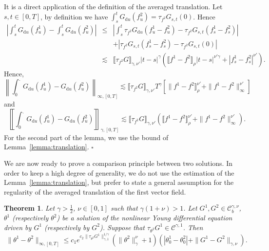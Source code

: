 \documentclass[a4paper,11pt]{article}
\newcommand{\mathd}{\mathrm{d}}
\newtheorem{theorem}{Theorem}[section]
\newenvironment{proof}{{\sc Proof.}}{\hfill$\square$}
\newcommand{\CC}{\mathscr C}
\begin{document}
\begin{proof}
  It is a direct application of the definition of the averaged translation.
  Let $s,t \in [ 0,T ]$, by definition we have $\int_{s}^{t} G_{\mathd u} (
  f^{2}_{u} ) = \tau_{f^{2}} G_{s,t} ( 0 )$. Hence
  \begin{eqnarray*}
    \left\lvert \int_{s}^{t} G_{\mathd u} ( f^{1}_{u} ) - \int_{s}^{t} G_{\mathd u}
    ( f^{2}_{u} ) \right\lvert & \leqslant & \left\lvert \int_{s}^{t} \tau_{f^{2}}
    G_{\mathd u} ( f^{1}_{u} -f^{2}_{u} ) - \tau_{f^{2}} G_{s,t} ( f^{1}_{s}
    -f^{2}_{s} ) \right\lvert\\
    &  & + | \tau_{f^{2}} G_{s,t} ( f^{1}_{s} -f^{2}_{s} ) - \tau_{f^{2}}
    G_{s,t} ( 0 ) |\\
    & \lesssim & \llbracket \tau_{f^{2}} G \rrbracket_{\gamma , \nu'} | t-s
    |^{\gamma} ( \llbracket f^{1} -f^{2} \rrbracket_{\rho} | t-s |^{\nu'
    \gamma} + | f_{s}^{1} -f_{s}^{2} |^{\nu'} ).
  \end{eqnarray*}
  Hence,
  \[ \left\| \int_{0}^{.} G_{\mathd u} ( f^{1}_{u} ) -G_{\mathd u} ( f^{2}_{u}
     ) \right\|_{\infty , [ 0,T ]} \lesssim \llbracket \tau_{f^{2}} G
     \rrbracket_{\gamma , \nu'} T^{\gamma} [ \| f^{1} -f^{2}
     \rrbracket^{\nu'}_{\rho} + \| f^{1} -f^{2} \|^{\nu'}_{\infty} ] \]
  and
  \[ \left\llbracket \int_{0}^{.} G_{\mathd u} ( f^{1}_{u} ) -G_{\mathd u} (
     f^{2}_{u} ) \right\rrbracket_{\gamma , [ 0,T ]} \lesssim \llbracket
     \tau_{f^{2}} G \rrbracket_{\gamma , \nu'} ( \llbracket f^{1} -f^{2}
     \rrbracket^{\nu'}_{\rho} + \| f^{1} -f^{2} \|^{\nu'}_{\infty} ) . \]
  For the second part of the lemma, we use the bound of
  Lemma~\ref{lemma:translation}.
\end{proof}

We are now ready to prove a comparison principle between two solutions. In order
to keep a high degree of generality, we do not use the estimation of the
Lemma~\ref{lemma:translation}, but prefer to state a general assumption for
the regularity of the averaged translation of the first vector field.

\begin{theorem}
  \label{theorem:comparison}Let $\gamma > \frac{1}{2}$, $\nu \in [ 0,1 ]$ such
  that $\gamma ( 1+ \nu ) >1$. Let $G^{1} ,G^{2} \in \CC_{b}^{\gamma , \nu}$,
  $\theta^{1}$ (respectively $\theta^{2}$) be a solution of the nonlinear Young
  differential equation driven by $G^{1}$ (respectively by $G^{2}$). Suppose
  that $\tau_{\theta^{2}} G^{1} \in \CC^{\gamma ,1}$. Then
  \[ \| \theta^{1} - \theta^{2} \|_{\infty , [ 0,T ]} \leqslant c_{1}
     e^{c_{2} \| \tau_{\theta^{2}} G^{1} \|_{\gamma ,1}^{1/ \gamma}} ( \|
     \theta^{2} \|^{\nu}_{\gamma} +1 ) ( | \theta^{1}_{0} - \theta^{2}_{0} | +
     \| G^{1} -G^{2} \|_{\gamma , \nu} ) . \]
\end{theorem}
\end{document}
